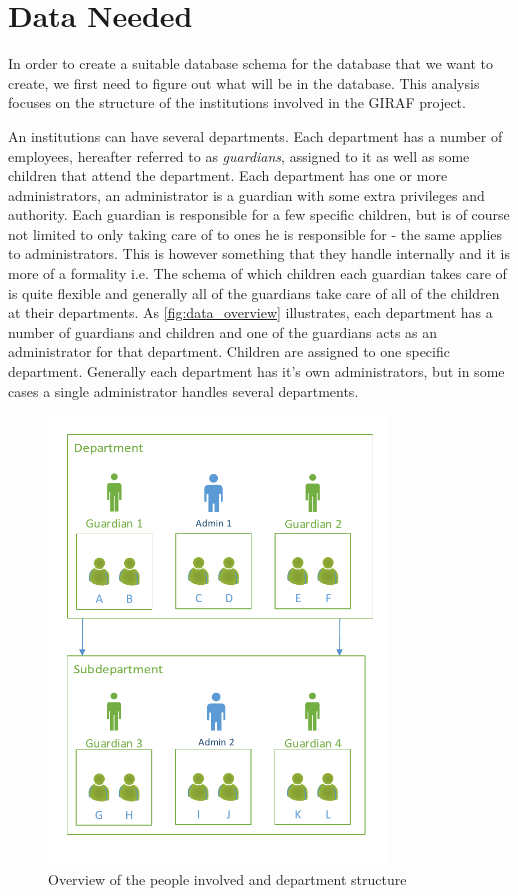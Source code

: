 \section{Data Needed}
In order to create a suitable database schema for the database that we want to create, we first need to figure out what will be in the database. This analysis focuses on the structure of the institutions involved in the GIRAF project. 

An institutions can have several departments. Each department has a number of employees, hereafter referred to as \emph{guardians}, assigned to it as well as some children that attend the department. Each department has one or more administrators, an administrator is a guardian with some extra privileges and authority. Each guardian is responsible for a few specific children, but is of course not limited to only taking care of to ones he is responsible for - the same applies to administrators. This is however something that they handle internally and it is more of a formality i.e. The schema of which children each guardian takes care of is quite flexible and generally all of the guardians take care of all of the children at their departments. As \autoref{fig:data_overview} illustrates, each department has a number of guardians and children and one of the guardians acts as an administrator for that department. Children are assigned to one specific department. Generally each department has it's own administrators, but in some cases a single administrator handles several departments.

\begin{figure}[hptb]
	\begin{center}
	\includegraphics[width=0.8\textwidth]{img/data_overview.pdf}
	\caption{Overview of the people involved and department structure}
	\label{fig:data_overview}
	\end{center}
\end{figure} 

